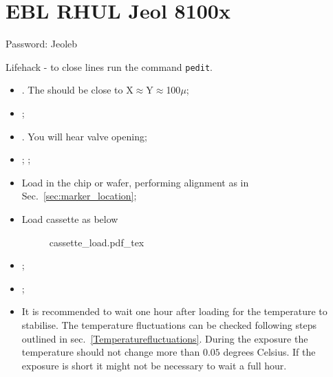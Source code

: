 
\section{EBL RHUL Jeol 8100x}
Password: Jeoleb%

\begin{framed}\noindent
  Lifehack - to close lines run the command \texttt{pedit}.
\end{framed}

\begin{itemize} 
\item {}. The
   should be close to X$\approx$Y$\approx$100$\mu$;
\item {};
\item {}. You will hear
  valve opening;
\item  {};  \ec;
\item Load in the chip or wafer, performing alignment as in Sec.~\ref{sec:marker_location};
\item Load cassette as below
  \begin{figure}[h]
    \centering \def\svgwidth{6cm}{cassette_load.pdf_tex}
  \end{figure}

\item {};
\item {};
\item It is recommended to wait one hour  after loading for the temperature to stabilise.  The
  temperature    fluctuations    can    be     checked    following    steps    outlined    in
  sec.~\ref{Temperaturefluctuations}.  During  the exposure the temperature  should not change
  more than $0.05$ degrees Celsius. If the exposure is short it might not be necessary to wait
  a full hour.
\end{itemize}

